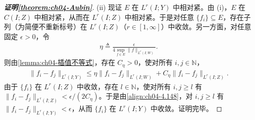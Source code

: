 \documentclass[../../main.tex]{subfiles}%
\begin{document}
\begin{proof}[\textbf{证明\cref{theorem:ch04-Aubin}}]
(ii) 现证 $E$ 在 $L^r(I;Y)$ 中相对紧。由 (i)，$E$ 在 $C(I;Z)$ 中相对紧，从而在 $L^r(I;Z)$ 中相对紧。于是对任意 $\{f_i\}\subseteq E$，存在子列（为简便不重新标号）在 $L^r(I;Z)$（$r\in[1,\infty]$）中收敛。另一方面，对任意固定 $\epsilon>0$，令
\begin{align*}
\eta\triangleq \frac{\epsilon}{4\sup_{f\in E}\|f\|_{L^r(I;W)}}.
\end{align*}
则由\cref{lemma:ch04-插值不等式}，存在 $C_\eta>0$，使对所有 $i,j\in\mathbb{N}$，
\begin{align}
\|f_i-f_j\|_{L^r(I;Y)}\leqslant\eta\|f_i-f_j\|_{L^r(I;W)}+C_\eta\|f_i-f_j\|_{L^r(I;Z)}. \label{align:ch04-4.148}
\end{align}
由于 $\{f_i\}$ 在 $L^r(I;Z)$ 中收敛，存在 $l\in\mathbb{N}$，使对所有 $i,j\geqslant l$ 有 $\|f_i-f_j\|_{L^r(I;Z)}<\epsilon/(2C_\eta)$。于是由\eqref{align:ch04-4.148}，对 $i,j\geqslant l$ 有 $\|f_i-f_j\|_{L^r(I;Y)}<\epsilon$，从而 $\{f_i\}$ 在 $L^r(I;Y)$ 中收敛。证明完毕。
\end{proof}
\end{document}
